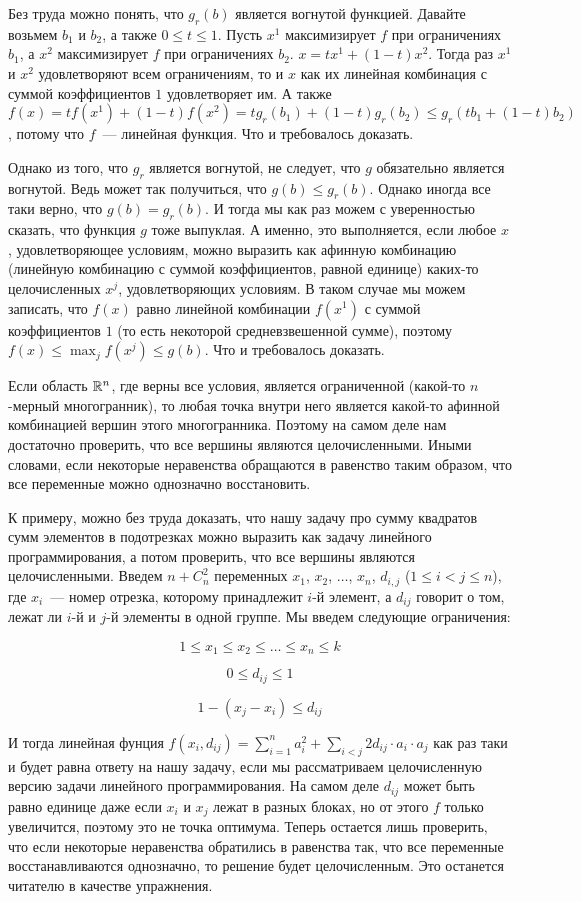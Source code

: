 Без труда можно понять, что $g_r(b)$ является вогнутой функцией. Давайте возьмем $b_1$ и $b_2$, а также $0 \le t \le 1$. Пусть $x^1$ максимизирует $f$ при ограничениях $b_1$, а $x^2$ максимизирует $f$ при ограничениях $b_2$. $x = t x^1 + (1 - t) x^2$. Тогда раз $x^1$ и $x^2$ удовлетворяют всем ограничениям, то и $x$ как их линейная комбинация с суммой коэффициентов $1$ удовлетворяет им. А также $f(x) = t f(x^1) + (1 - t)f(x^2) = tg_r(b_1) + (1-t)g_r(b_2) \le g_r(tb_1 + (1-t)b_2)$, потому что $f$~--- линейная функция. Что и требовалось доказать.

Однако из того, что $g_r$ является вогнутой, не следует, что $g$ обязательно является вогнутой. Ведь может так получиться, что $g(b) \le g_r(b)$. Однако иногда все таки верно, что $g(b) = g_r(b)$. И тогда мы как раз можем с уверенностью сказать, что функция $g$ тоже выпуклая. А именно, это выполняется, если любое $x$, удовлетворяющее условиям, можно выразить как афинную комбинацию (линейную комбинацию с суммой коэффициентов, равной единице) каких-то целочисленных $x^j$, удовлетворяющих условиям. В таком случае мы можем записать, что $f(x)$ равно линейной комбинации $f(x^1)$ с суммой коэффициентов $1$ (то есть некоторой средневзвешенной сумме), поэтому $f(x) \le \max_j f(x^j) \le g(b)$. Что и требовалось доказать.

Если область $\mathbb{R}^n$, где верны все условия, является ограниченной (какой-то $n$-мерный многогранник), то любая точка внутри него является какой-то афинной комбинацией вершин этого многогранника. Поэтому на самом деле нам достаточно проверить, что все вершины являются целочисленными. Иными словами, если некоторые неравенства обращаются в равенство таким образом, что все переменные можно однозначно восстановить.

К примеру, можно без труда доказать, что нашу задачу про сумму квадратов сумм элементов в подотрезках можно выразить как задачу линейного программирования, а потом проверить, что все вершины являются целочисленными. Введем $n + C_n^2$ переменных $x_1$, $x_2$, $\ldots$, $x_n$, $d_{i, j}$ ($1 \le i < j \le n$), где $x_i$~--- номер отрезка, которому принадлежит $i$-й элемент, а $d_{i j}$ говорит о том, лежат ли $i$-й и $j$-й элементы в одной группе. Мы введем следующие ограничения:

$$1 \le x_1 \le x_2 \le \ldots \le x_n \le k$$

$$0 \le d_{i j} \le 1$$

$$1 - (x_j - x_i) \le d_{i j}$$

И тогда линейная фунция $f(x_i, d_{ij}) = \sum_{i = 1}^{n} a_i^2 + \sum_{i < j} 2 d_{i j} \cdot a_i \cdot a_j$ как раз таки и будет равна ответу на нашу задачу, если мы рассматриваем целочисленную версию задачи линейного программирования. На самом деле $d_{i j}$ может быть равно единице даже если $x_i$ и $x_j$ лежат в разных блоках, но от этого $f$ только увеличится, поэтому это не точка оптимума. Теперь остается лишь проверить, что если некоторые неравенства обратились в равенства так, что все переменные восстанавливаются однозначно, то решение будет целочисленным. Это останется читателю в качестве упражнения.


